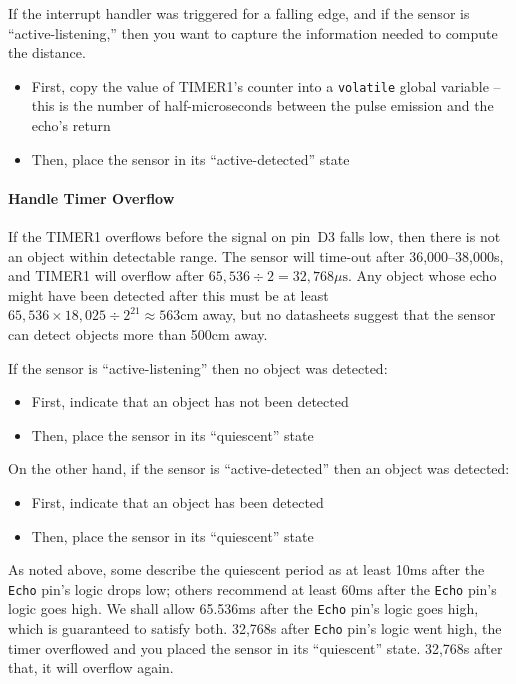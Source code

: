 If the interrupt handler was triggered for a falling edge, and if the sensor is ``active-listening,'' then you want to capture the information needed to compute the distance.
\begin{itemize}
    \item First, copy the value of TIMER1's counter into a \lstinline{volatile} global variable -- this is the number of half-microseconds between the pulse emission and the echo's return
    \item Then, place the sensor in its ``active-detected'' state
\end{itemize}

\paragraph{Handle Timer Overflow}

If the TIMER1 overflows before the signal on pin~D3 falls low, then there is not an object within detectable range.
The sensor will time-out after 36,000--38,000\textmu s, and TIMER1 will overflow after $65,536 \div 2 = 32,768\mu \mathrm{s}$.
Any object whose echo might have been detected after this must be at least $65,536 \times 18,025 \div 2^{21} \approx 563\mathrm{cm}$ away, but no datasheets suggest that the sensor can detect objects more than 500cm away.

If the sensor is ``active-listening'' then no object was detected:
\begin{itemize}
    \item First, indicate that an object has not been detected
    \item Then, place the sensor in its ``quiescent'' state
\end{itemize}

On the other hand, if the sensor is ``active-detected'' then an object was detected:
\begin{itemize}
    \item First, indicate that an object has been detected
    \item Then, place the sensor in its ``quiescent'' state
\end{itemize}

As noted above, some describe the quiescent period as at least 10ms after the \texttt{Echo} pin's logic drops low; others recommend at least 60ms after the \texttt{Echo} pin's logic goes high.
We shall allow 65.536ms after the \texttt{Echo} pin's logic goes high, which is guaranteed to satisfy both.
32,768\textmu s after \texttt{Echo} pin's logic went high, the timer overflowed and you placed the sensor in its ``quiescent'' state.
32,768\textmu s after that, it will overflow again.

